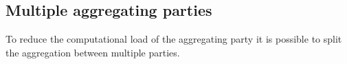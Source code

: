 



 
 
\subsection*{Multiple aggregating parties}
To reduce the computational load of the aggregating party it is possible to split the aggregation between multiple parties. %

